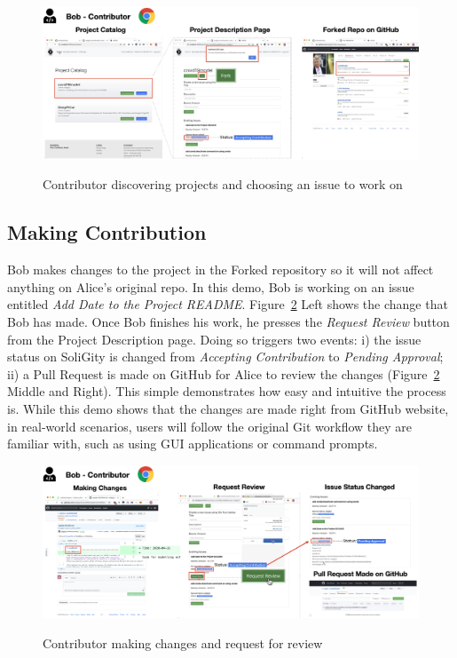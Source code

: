 \documentclass[12pt]{article}
\renewcommand{\_}{\kern-1.5pt\textunderscore\kern-1.5pt}
\begin{document}
\begin{figure}[H]
	\centering
	\includegraphics[width=16.5cm]{graphs/52. discover_1.png}\\
	\caption{Contributor discovering projects and choosing an issue to work on}
	\label{fig:discover1}
\end{figure}

\subsection{Making Contribution}
Bob makes changes to the project in the Forked repository so it will not affect anything on Alice's original repo. In this demo, Bob is working on an issue entitled \textit{Add Date to the Project README}. Figure~\ref{fig:contribute1} Left shows the change that Bob has made. Once Bob finishes his work, he presses the \textit{Request Review} button from the Project Description page. Doing so triggers two events: i) the issue status on SoliGity is changed from \textit{Accepting Contribution} to \textit{Pending Approval}; ii) a Pull Request is made on GitHub for Alice to review the changes (Figure~\ref{fig:contribute1} Middle and Right).  This simple demonstrates how easy and intuitive the process is. While this demo shows that the changes are made right from GitHub website, in real-world scenarios, users will follow the original Git workflow they are familiar with, such as using GUI applications or command prompts.

\begin{figure}[H]
	\centering
	\includegraphics[width=16.5cm]{graphs/53. contribute_1.png}\\
	\caption{Contributor making changes and request for review}
	\label{fig:contribute1}
\end{figure}
\end{document}
